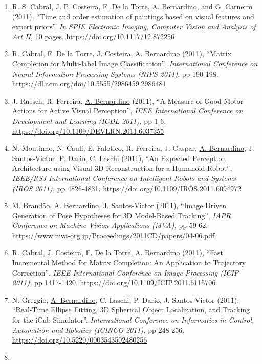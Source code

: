 \begin{enumerate}
  \url{https://doi.org/10.1007/978-3-642-33179-4_17}~
\item
  R. S. Cabral, J. P. Costeira, F. De la Torre, \ul{A. Bernardino}, and
  G. Carneiro (2011), ``Time and order estimation of paintings based on
  visual features and expert priors''. \emph{In SPIE Electronic Imaging,
  Computer Vision and Analysis of Art II,} 10 pages.
  \url{https://doi.org/10.1117/12.872256}~
\item
  R. Cabral, F. De la Torre, J. Costeira, \ul{A. Bernardino} (2011),
  ``Matrix Completion for Multi-label Image Classification'',
  \emph{International Conference on Neural Information Processing
  Systems} \emph{(NIPS 2011)}, pp 190-198.
  \url{https://dl.acm.org/doi/10.5555/2986459.2986481}
\item
  J. Ruesch, R. Ferreira, \ul{A. Bernardino} (2011), ``A Measure of Good
  Motor Actions for Active Visual Perception'', \emph{IEEE International
  Conference on Development and Learning (ICDL 2011),} pp 1-6.
  \url{https://doi.org/10.1109/DEVLRN.2011.6037355}~
\item
  N. Moutinho, N. Cauli, E. Falotico, R. Ferreira, J. Gaspar, \ul{A.
  Bernardino}, J. Santos-Victor, P. Dario, C. Laschi (2011), ``An
  Expected Perception Architecture using Visual 3D Reconstruction for a
  Humanoid Robot'', \emph{IEEE/RSJ International Conference on
  Intelligent Robots and Systems (IROS 2011),} pp 4826-4831.
  \url{https://doi.org/10.1109/IROS.2011.6094972}~
\item
  M. Brandão, \ul{A. Bernardino}, J. Santos-Victor (2011), ``Image
  Driven Generation of Pose Hypotheses for 3D Model-Based Tracking'',
  \emph{IAPR Conference on Machine Vision Applications (MVA),} pp 59-62.
  \url{https://www.mva-org.jp/Proceedings/2011CD/papers/04-06.pdf}
\item
  R. Cabral, J. Costeira, F. De la Torre, \ul{A. Bernardino} (2011),
  ``Fast Incremental Method for Matrix Completion: An Application to
  Trajectory Correction'', \emph{IEEE International Conference on Image
  Processing (ICIP 2011),} pp 1417-1420.
  \url{https://doi.org/10.1109/ICIP.2011.6115706}~
\item
  N. Greggio, \ul{A. Bernardino}, C. Laschi, P. Dario, J. Santos-Victor
  (2011), ``Real-Time Ellipse Fitting, 3D Spherical Object Localization,
  and Tracking for the iCub Simulator''. \emph{International Conference
  on Informatics in Control, Automation and Robotics (ICINCO 2011),} pp
  248-256. \url{https://doi.org/10.5220/0003543502480256}~
\item

\end{enumerate}
